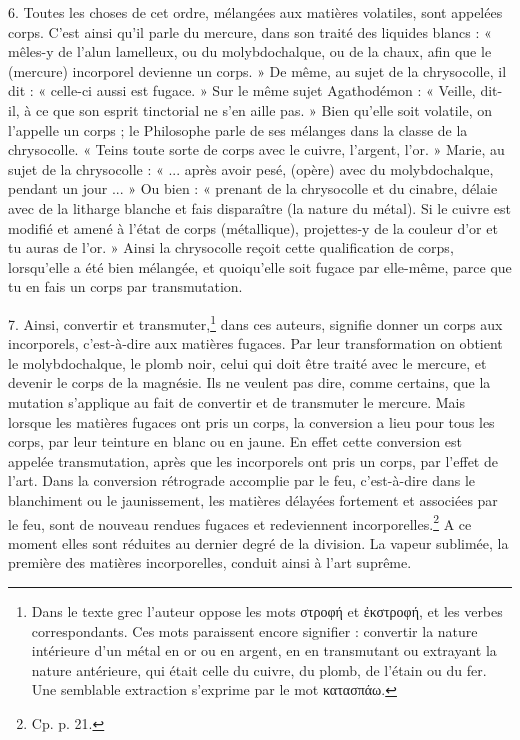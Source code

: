 \documentclass[landscape, a4paper, 11pt, oneside, polutonikogreek, french]{article}
\begin{document}
6. Toutes les choses de cet ordre, mélangées aux matières volatiles, sont appelées corps. C'est ainsi qu'il parle du mercure, dans son traité des liquides blancs : « mêles-y de l'alun lamelleux, ou du molybdochalque, ou de la chaux, afin que le (mercure) incorporel devienne un corps. » De même, au sujet de la chrysocolle, il dit : « celle-ci aussi est fugace. » Sur le même sujet Agathodémon : « Veille, dit-il, à ce que son esprit tinctorial ne s'en aille pas. » Bien qu'elle soit volatile, on l'appelle un corps ; le Philosophe parle de ses mélanges dans la classe de la chrysocolle. « Teins toute sorte de corps avec le cuivre, l'argent, l'or. » Marie, au sujet de la chrysocolle : « ... après avoir pesé, (opère) avec du molybdochalque, pendant un jour ... » Ou bien : « prenant de la chrysocolle et du cinabre, délaie avec de la litharge blanche et fais disparaître (la nature du métal). Si le cuivre est modifié et amené à l'état de corps (métallique), projettes-y de la couleur d'or et tu auras de l'or. » Ainsi la chrysocolle reçoit cette qualification de corps, lorsqu'elle a été bien mélangée, et quoiqu'elle soit fugace par elle-même, parce que tu en fais un corps par transmutation.

7. Ainsi, convertir et transmuter,\footnote{Dans le texte grec l'auteur oppose les mots στροφή et ἐκστροφή, et les verbes correspondants. Ces mots paraissent encore signifier : convertir la nature intérieure d'un métal en or ou en argent, en en transmutant ou extrayant la nature antérieure, qui était celle du cuivre, du plomb, de l'étain ou du fer. Une semblable extraction s'exprime par le mot κατασπάω.} dans ces auteurs, signifie donner un corps aux incorporels, c'est-à-dire aux matières fugaces. Par leur transformation on obtient le molybdochalque, le plomb noir, celui qui doit être traité avec le mercure, et devenir le corps de la magnésie. Ils ne veulent pas dire, comme certains, que la mutation s'applique au fait de convertir et de transmuter le mercure. Mais lorsque les matières fugaces ont pris un corps, la conversion a lieu pour tous les corps, par leur teinture en blanc ou en jaune. En effet cette conversion est appelée transmutation, après que les incorporels ont pris un corps, par l'effet de l'art. Dans la conversion rétrograde accomplie par le feu, c'est-à-dire dans le blanchiment ou le jaunissement, les matières délayées fortement et associées par le feu, sont de nouveau rendues fugaces et redeviennent incorporelles.\footnote{Cp. p. 21.} A ce moment elles sont réduites au dernier degré de la division. La vapeur sublimée, la première des matières incorporelles, conduit ainsi à l'art suprême.
\end{document}
